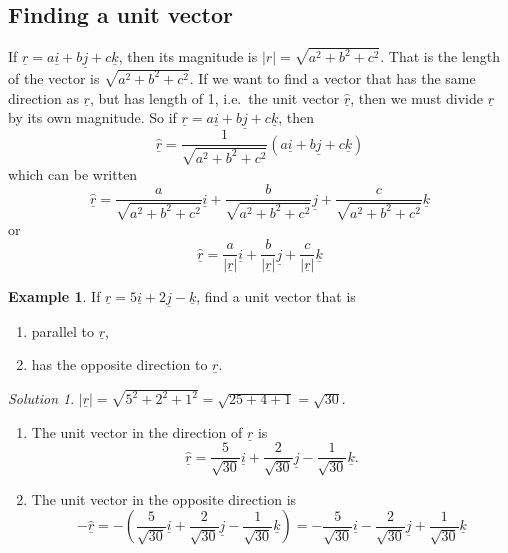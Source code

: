 \documentclass[
  11pt,
  oneside]{book}
\providecommand{\tightlist}{%
  \setlength{\itemsep}{0pt}\setlength{\parskip}{0pt}}
\newcommand{\slide}{}
\theoremstyle{definition}
\theoremstyle{definition}
\newtheorem{example}{Example}[chapter]
\theoremstyle{definition}
\theoremstyle{definition}
\theoremstyle{remark}
\newtheorem*{solution}{Solution}
\begin{document}
\slide

\subsection{Finding a unit vector}\label{finding-a-unit-vector}

If \(\underline r = a\underline i + b\underline j + c\underline k\), then its magnitude is \(|r| = \sqrt{a^2+b^2+c^2}\). That is the length of the vector is \(\sqrt{a^2+b^2+c^2}\). If we want to find a vector that has the same direction as \(\underline r\), but has length of 1, i.e.~the unit vector \(\underline{\hat r}\), then we must divide \(\underline r\) by its own magnitude. So if \(\underline r = a\underline i + b\underline j + c\underline k\), then
\[
\underline{\hat r} = \frac{1}{\sqrt{a^2+b^2+c^2}}(a\underline i+b\underline j+c\underline k)
\]
which can be written
\[
\underline{\hat r} = \frac{a}{\sqrt{a^2+b^2+c^2}}\underline i+\frac{b}{\sqrt{a^2+b^2+c^2}}\underline j+\frac{c}{\sqrt{a^2+b^2+c^2}}\underline k
\]
or
\[
\underline{\hat r} = \frac{a}{|\underline r|}\underline i+\frac{b}{|\underline r|}\underline j+\frac{c}{|\underline r|}\underline k
\]
\slide

\begin{example}

If \(\underline r = 5\underline i+2\underline j-\underline k\), find a unit vector that is

\begin{enumerate}
\def\labelenumi{\alph{enumi}.}
\tightlist
\item
  parallel to \(\underline r\),
\item
  has the opposite direction to \(\underline r\).
\end{enumerate}

\end{example}

\begin{solution}

\(|\underline r| = \sqrt{5^2+2^2+1^2} = \sqrt{25+4+1} = \sqrt{30}\).

\begin{enumerate}
\def\labelenumi{\alph{enumi}.}
\tightlist
\item
  The unit vector in the direction of \(\underline r\) is
  \[
  \underline{\hat r} = \frac5{\sqrt{30}}\underline i+\frac2{\sqrt{30}}\underline j-\frac1{\sqrt{30}}\underline k.
  \]
\item
  The unit vector in the opposite direction is
  \[
  -\underline{\hat r} = -\left(\frac{5}{\sqrt{30}}\underline i+\frac{2}{\sqrt{30}}\underline j-\frac{1}{\sqrt{30}}\underline k\right) = -\frac{5}{\sqrt{30}}\underline i-\frac{2}{\sqrt{30}}\underline j+\frac{1}{\sqrt{30}}\underline k
  \]
\end{enumerate}

\end{solution}
\end{document}
